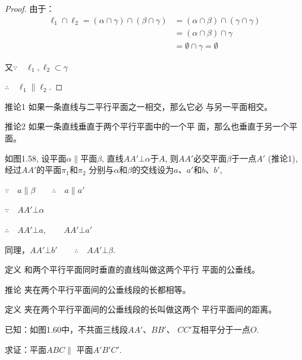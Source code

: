 \begin{proof}
由于：
\[\begin{split}
  \ell_1\cap \ell_2=(\alpha\cap \gamma)\cap (\beta\cap \gamma)&=(\alpha\cap \beta)\cap (\gamma\cap \gamma)\\
  &=(\alpha\cap \beta)\cap \gamma\\
  &=\emptyset\cap\gamma=\emptyset
\end{split}\]

又$\because\quad \ell_1,\ell_2\subset\gamma$

$\therefore\quad\ell_1\parallel \ell_2$.
\end{proof}

\begin{blk}
  {推论1} 如果一条直线与二平行平面之一相交，那么它必
与另一平面相交。
\end{blk}


\begin{blk}
  {推论2} 如果一条直线垂直于两个平行平面中的一个平
面，那么也垂直于另一个平面。
\end{blk}

如图1.58, 设平面$\alpha\parallel$平面$\beta$, 直线$AA'\bot\alpha$于$A$, 则$AA'$必交平面$\beta$于一点$A'$ (推论1), 经过$AA'$的平面$\pi_1$和$\pi_2$
分别与$\alpha$和$\beta$的交线设为$a$、$a'$和$b$、$b'$,

$\because\quad a\parallel \beta \qquad \therefore\quad a\parallel a'$

$\because\quad AA'\bot \alpha$

$\therefore\quad AA'\bot a,\quad \quad AA'\bot a'$

同理，$AA'\bot b'\qquad \therefore\quad AA'\bot\beta$.



\begin{blk}
  {定义} 和两个平行平面同时垂直的直线叫做这两个平行
平面的公垂线。
\end{blk}


\begin{blk}
  {推论} 夹在两个平行平面间的公垂线段的长都相等。
\end{blk}


\begin{blk}
{定义} 夹在两个平行平面间的公垂线段的长叫做这两个
平行平面间的距离。
  \end{blk}

\begin{example}
  已知：如图1.60中，不共面三线段$AA'$、$BB'$、
  $CC'$互相平分于一点$O$.

  求证：平面$ABC\parallel$ 平面$A'B'C'$.
\end{example}

